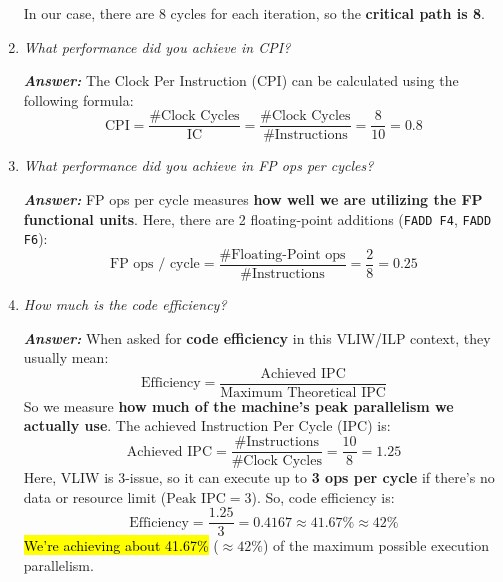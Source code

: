 \begin{enumerate}
    In our case, there are 8 cycles for each iteration, so the \textbf{critical path is 8}.


    \item \emph{What performance did you achieve in CPI?}

    \textcolor{Green3}{\textbf{\emph{Answer:}}} The Clock Per Instruction (CPI) can be calculated using the following formula:
    \begin{equation*}
        \text{CPI} = \dfrac{\text{\# Clock Cycles}}{\text{IC}} = \dfrac{\text{\# Clock Cycles}}{\text{\# Instructions}} = \dfrac{8}{10} = 0.8
    \end{equation*}


    \item \emph{What performance did you achieve in FP ops per cycles?}
    
    \textcolor{Green3}{\textbf{\emph{Answer:}}} FP ops per cycle measures \textbf{how well we are utilizing the FP functional units}. Here, there are 2 floating-point additions (\texttt{FADD F4}, \texttt{FADD F6}):
    \begin{equation*}
        \text{FP ops / cycle} = \dfrac{\text{\# Floating-Point ops}}{\text{\# Instructions}} = \dfrac{2}{8} = 0.25
    \end{equation*}


    \item \emph{How much is the code efficiency?}
    
    \textcolor{Green3}{\textbf{\emph{Answer:}}} When asked for \textbf{code efficiency} in this VLIW/ILP context, they usually mean:
    \begin{equation*}
        \text{Efficiency} = \frac{\text{Achieved IPC}}{\text{Maximum Theoretical IPC}}
    \end{equation*}
    So we measure \textbf{how much of the machine's peak parallelism we actually use}. The achieved Instruction Per Cycle (IPC) is:
    \begin{equation*}
        \text{Achieved IPC} = \dfrac{\text{\# Instructions}}{\text{\# Clock Cycles}} = \dfrac{10}{8} = 1.25
    \end{equation*}
    Here, VLIW is 3-issue, so it can execute up to \textbf{3 ops per cycle} if there's no data or resource limit ($\text{Peak IPC} = 3$). So, code efficiency is:
    \begin{equation*}
        \text{Efficiency} = \frac{1.25}{3} = 0.4167 \approx 41.67\% \approx 42\%
    \end{equation*}
    \hl{We're achieving about 41.67\%} ($\approx 42 \%$) of the maximum possible execution parallelism.
\end{enumerate}

